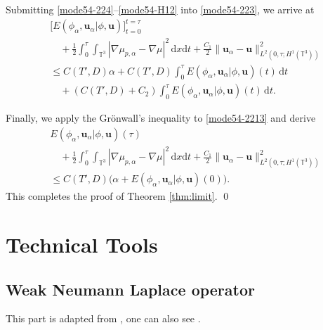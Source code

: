 \documentclass[reqno,a4paper,11pt]{amsart}
\theoremstyle{plain}
\numberwithin{equation}{section}
\renewcommand{\d}{\mathrm{d}}
\newcommand{\dxdt}{\,\d x \d t}
\newcommand{\dt}{\d t}
\begin{document}
				Submitting  \eqref{mode54-224}--\eqref{mode54-H12} into \eqref{mode54-223}, we arrive at
				\begin{align}
					\label{mode54-2213}
					&\nonumber \bigg[ E(\phi_{\alpha},\mathbf{u}_{\alpha}|\phi,\mathbf{u})\bigg]_{t=0}^{t=\tau}
					\\&\nonumber\quad+\frac{1}{2}\int_0^{\tau}\int_{\mathbb{T}^{3}}|\nabla \mu_{p,\alpha}-\nabla \mu|^{2}\dxdt
					+ \frac{ C_1}{2} \| \mathbf{u}_{\alpha}-\mathbf{u}\|_{L^2(0,\tau;H^{1}(\mathbb{T}^{3}))}^{2}
					\\&\nonumber\leq C(T',D)\alpha+C(T',D)\int_0^\tau E(\phi_{\alpha},\mathbf{u}_{\alpha}|\phi,\mathbf{u})(t)\,\dt
					\\&\quad+(C(T',D)+C_2)\int_0^\tau E(\phi_{\alpha},\mathbf{u}_{\alpha}|\phi,\mathbf{u})(t)\,\dt.
				\end{align}
				
				Finally, we  apply the Gr\"onwall's inequality to \eqref{mode54-2213} and  derive 
				\begin{align}
					\nonumber
					&  E(\phi_{\alpha},\mathbf{u}_{\alpha}|\phi,\mathbf{u})(\tau)
					\\&\nonumber\quad+\frac{1}{2}\int_0^{\tau}\int_{\mathbb{T}^{3}}|\nabla \mu_{p,\alpha}-\nabla \mu|^{2}\dxdt
					+\frac{ C_1}{2} \| \mathbf{u}_{\alpha}-\mathbf{u}\|_{L^2(0,\tau;H^{1}(\mathbb{T}^{3}))}^{2}
					\\&
					\label{eqs:Gronwall-E-tilde}
					\leq C(T',D)\bigg(\alpha+ E(\phi_{\alpha},\mathbf{u}_{\alpha}|\phi,\mathbf{u})(0)\bigg).
				\end{align}
				This completes the proof of Theorem \ref{thm:limit}. \qed
				
				\appendix
				\section{Technical Tools}
				\subsection{Weak Neumann Laplace operator}
				This part is adapted from \cite{AH1}, one can also see \cite{FFHL2024}.
				
\end{document}
